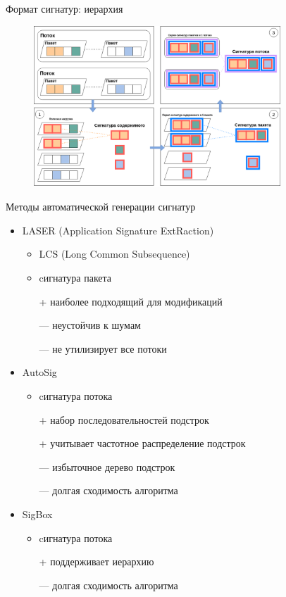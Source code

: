 \documentclass[10pt]{beamer}
\begin{document}
\begin{frame}{Формат сигнатур: иерархия}
    \begin{figure}
        \begin{adjustwidth}{-2em}{-2em}
            \centering
            \includegraphics[width=25em]{../images/signature_structure.png}
        \end{adjustwidth}
    \end{figure}

\end{frame}

\begin{frame}{Методы автоматической генерации сигнатур}

    \begin{itemize}
        \item \alert{LASER} (Application Signature ExtRaction)
        \begin{itemize}
            \item \alert{LCS} (Long Common Subsequence)
            \item cигнатура пакета
            \item[+] наиболее подходящий для модификаций
            \item[---] неустойчив к шумам
            \item[---] не утилизирует все потоки
        \end{itemize}
        \item AutoSig
        \begin{itemize}
            \item cигнатура потока
            \item[+] набор последовательностей подстрок
            \item[+] учитывает частотное распределение подстрок
            \item[---] избыточное дерево подстрок
            \item[---] долгая сходимость алгоритма
        \end{itemize}
        \item SigBox
        \begin{itemize}
            \item cигнатура потока
            \item[+] поддерживает иерархию
            \item[---] долгая сходимость алгоритма
        \end{itemize}
    \end{itemize}

\end{frame}
\end{document}
